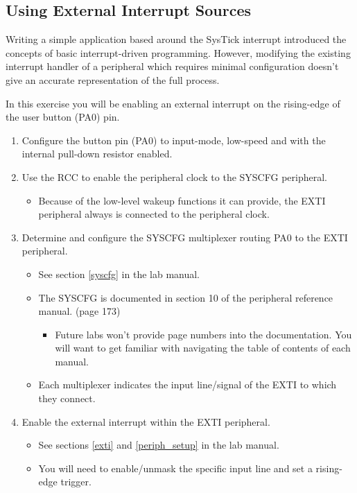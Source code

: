 \documentclass[11pt,fleqn]{book} %
\begin{document}
\subsection{Using External Interrupt Sources}
Writing a simple application based around the SysTick interrupt introduced the concepts of basic interrupt-driven programming. However, modifying the existing interrupt handler of a peripheral which requires minimal configuration doesn't give an accurate representation of the full process.  

In this exercise you will be enabling an external interrupt on the rising-edge of the user button (PA0) pin. 
 
\begin{enumerate}
    \item Configure the button pin (PA0) to input-mode, low-speed and with the internal pull-down resistor enabled. 
    \item Use the RCC to enable the peripheral clock to the SYSCFG peripheral.
    \begin{itemize}
        \item Because of the low-level wakeup functions it can provide, the EXTI peripheral always is connected to the peripheral clock.
    \end{itemize}
    \item Determine and configure the SYSCFG multiplexer routing PA0 to the EXTI peripheral.
    \begin{itemize}
        \item See section \ref{syscfg} in the lab manual.
        \item The SYSCFG is documented in section 10 of the peripheral reference manual. (page 173)
        \begin{itemize}
            \item Future labs won't provide page numbers into the documentation. You will want to get familiar with navigating the table of contents of each manual.
        \end{itemize}
        \item Each multiplexer indicates the input line/signal of the EXTI to which they connect.
    \end{itemize}
    \item Enable the external interrupt within the EXTI peripheral.
    \begin{itemize}
        \item See sections \ref{exti} and \ref{periph_setup} in the lab manual.
        \item  You will need to enable/unmask the specific input line and set a rising-edge trigger.

\end{itemize}
\end{enumerate}
\end{document}
